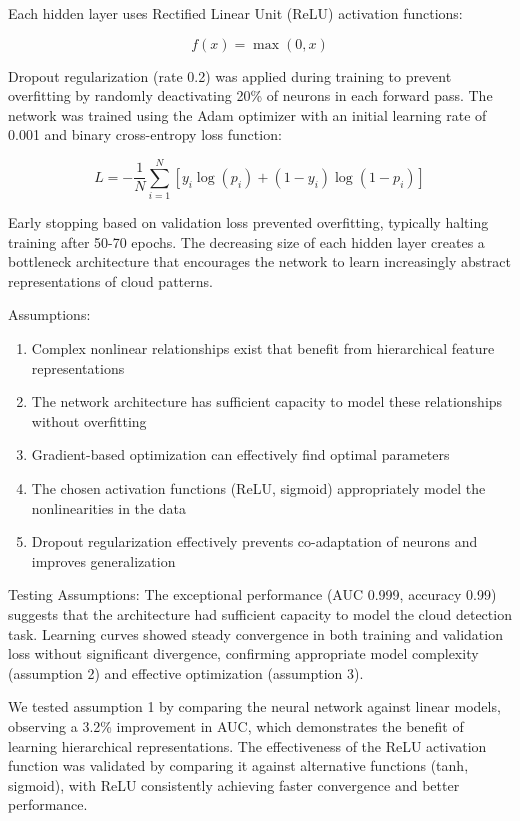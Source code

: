 \documentclass[10pt,letterpaper]{article}
\begin{document}
Each hidden layer uses Rectified Linear Unit (ReLU) activation functions:

\begin{equation}
f(x) = \max(0, x)
\end{equation}

Dropout regularization (rate 0.2) was applied during training to prevent overfitting by randomly deactivating 20\% of neurons in each forward pass. The network was trained using the Adam optimizer with an initial learning rate of 0.001 and binary cross-entropy loss function:

\begin{equation}
L = -\frac{1}{N}\sum_{i=1}^{N}[y_i \log(p_i) + (1 - y_i) \log(1 - p_i)]
\end{equation}

Early stopping based on validation loss prevented overfitting, typically halting training after 50-70 epochs. The decreasing size of each hidden layer creates a bottleneck architecture that encourages the network to learn increasingly abstract representations of cloud patterns.

Assumptions:
\begin{enumerate}
    \item Complex nonlinear relationships exist that benefit from hierarchical feature representations
    \item The network architecture has sufficient capacity to model these relationships without overfitting
    \item Gradient-based optimization can effectively find optimal parameters
    \item The chosen activation functions (ReLU, sigmoid) appropriately model the nonlinearities in the data
    \item Dropout regularization effectively prevents co-adaptation of neurons and improves generalization
\end{enumerate}

Testing Assumptions:
The exceptional performance (AUC 0.999, accuracy 0.99) suggests that the architecture had sufficient capacity to model the cloud detection task. Learning curves showed steady convergence in both training and validation loss without significant divergence, confirming appropriate model complexity (assumption 2) and effective optimization (assumption 3).

We tested assumption 1 by comparing the neural network against linear models, observing a 3.2\% improvement in AUC, which demonstrates the benefit of learning hierarchical representations. The effectiveness of the ReLU activation function was validated by comparing it against alternative functions (tanh, sigmoid), with ReLU consistently achieving faster convergence and better performance.
\end{document}
